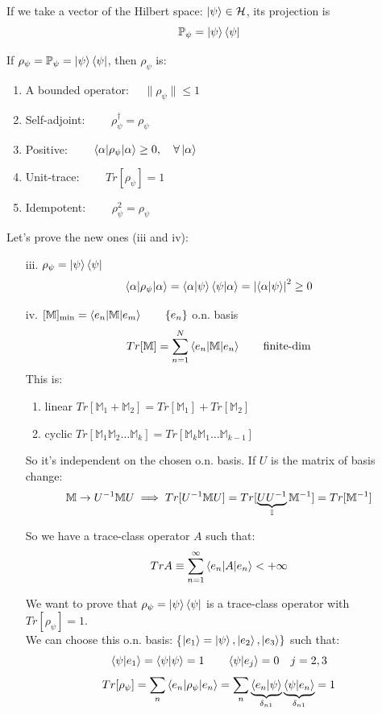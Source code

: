 \vspace{20pt}

If we take a vector of the Hilbert space: $\left|\psi\right\rangle \in \mathcal{H}$, its projection is
$$\mathbb{P}_\psi = \left|\psi\right\rangle\left\langle\psi\right|$$

\Th If $\rho_\psi = \mathbb{P}_\psi = \left|\psi\right\rangle\left\langle\psi\right|$, then $\rho_\psi$ is:
\begin{enumerate}[label=\roman*.]
    \item A bounded operator: $\quad \|\rho_\psi\| \le 1$ 
    \item Self-adjoint: $\qquad \rho_\psi^\dag = \rho_\psi$ 
    \item Positive: $\qquad \left\langle \alpha \middle| \rho_\psi \middle| \alpha \right\rangle \ge 0, \quad \forall \left|\alpha\right\rangle$ 
    \item Unit-trace: $\qquad  Tr[\rho_\psi] = 1$ 
    \item Idempotent: $\qquad \rho_\psi^2 = \rho_\psi$
\end{enumerate}

\vspace{10pt}
\Pf Let's prove the new ones (iii and iv):

\begin{enumerate}
    \item[iii.] $ \rho_\psi = \left|\psi\right\rangle\left\langle\psi\right|$
    $$ \left\langle \alpha \middle| \rho_\psi \middle| \alpha \right\rangle = \left\langle \alpha \middle| \psi \right\rangle \left\langle \psi \middle| \alpha \right\rangle = \left|\left\langle \alpha \middle| \psi \right\rangle\right|^2 \ge 0 $$
    \item[iv.] $[\mathbb{M}]_{\min} = \left\langle e_n \middle| \mathbb{M} \middle| e_m \right\rangle \qquad \{e_n\}$ o.n. basis
    $$ Tr[\mathbb{M}] = \sum_{n=1}^N \left\langle e_n \middle| \mathbb{M} \middle| e_n \right\rangle \qquad \text{finite-dim}$$
    This is:
    \begin{enumerate}[label=(\arabic*)]
        \item linear $Tr[\mathbb M_1 + \mathbb M_2] = Tr[\mathbb M_1] + Tr[\mathbb M_2]$
        \item cyclic $Tr[\mathbb M_1 \mathbb M_2 \dots \mathbb M_k] = Tr[\mathbb M_k \mathbb M_1\dots \mathbb M_{k-1}]$
    \end{enumerate}
    So it's independent on the chosen o.n. basis. If $U$ is the matrix of basis change:
    $$ \mathbb{M} \to U^{-1} \mathbb{M} U \implies Tr[U^{-1} \mathbb{M} U] = Tr [\underbrace{UU^{-1}}_{\mathbb{I}} \mathbb {M}^{-1}] = Tr[\mathbb{M}^{-1}]$$

    So we have a trace-class operator $A$ such that:
    $$Tr A \equiv \sum_{n=1}^\infty \left\langle e_n \middle| A \middle| e_n \right\rangle < +\infty$$

    We want to prove that $\rho_\psi = \left|\psi\right\rangle\left\langle\psi\right|$ is a trace-class operator with \\$Tr[\rho_\psi] = 1$.\\
    We can choose this o.n. basis: \{$\left|e_1\right\rangle = \left|\psi\right\rangle,  \left|e_2\right\rangle , \left|e_3\right\rangle\}$ such that:
    $$\left\langle \psi \middle| e_1 \right\rangle = \left\langle \psi \middle| \psi \right\rangle = 1 \qquad \left\langle \psi \middle| e_j \right\rangle = 0 \quad j=2,3$$
    $$Tr[\rho_\psi] = \sum_n \left\langle e_n \middle| \rho_\psi \middle| e_n \right\rangle = \sum_n \underbrace{\left\langle e_n \middle| \psi \right\rangle}_{\delta_{n1}}\underbrace{\left\langle \psi \middle| e_n \right\rangle}_{\delta_{n1}} = 1$$
\end{enumerate}
\EndPf

